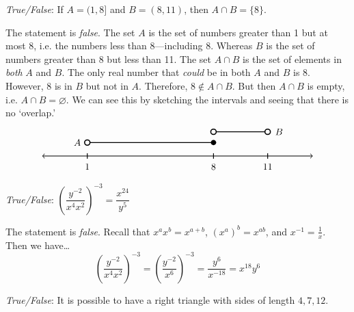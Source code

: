 \documentclass[11pt,letterpaper]{article}
\begin{document}
\thispagestyle{title}

 \textit{True/False}: If $A= (1, 8]$ and $B= (8, 11)$, then $A \cap B= \{ 8 \}$. \pspace

\sol The statement is \textit{false}. The set $A$ is the set of numbers greater than 1 but at most 8, i.e. the numbers less than 8---including 8. Whereas $B$ is the set of numbers greater than 8 but less than 11. The set $A \cap B$ is the set of elements in \textit{both} $A$ and $B$. The only real number that \textit{could} be in both $A$ and $B$ is $8$. However, 8 is in $B$ but not in $A$. Therefore, $8 \notin A \cap B$. But then $A \cap B$ is empty, i.e. $A \cap B= \varnothing$. We can see this by sketching the intervals and seeing that there is no `overlap.' 
	\[
	\begin{tikzpicture}
	\draw[line width=0.03cm,<->] (-5,0) -- (5,0);		%
	
	\draw[line width=0.03cm] (-3.33,-0.1) -- (-3.33,0.1);	%
	\draw[line width=0.03cm] (1.33,-0.1) -- (1.33,0.1); 	%
	\draw[line width=0.03cm] (3.33,-0.1) -- (3.33,0.1);	%
	\draw[line width=0.03cm] (-3.33, 0.5) -- (1.33,0.5);			%
	\draw[fill=white,line width=0.04cm] (-3.33,0.5) circle (0.1);		%
	\draw[draw=none,fill=black] (1.33,0.5) circle (0.1);			%
	\node at (-3.7,0.5) {$A$};								%
	\draw[line width=0.03cm] (1.33, 0.9) -- (3.33,0.9);			%
	\draw[fill=white,line width=0.04cm] (1.33,0.9) circle (0.1);		%
	\draw[fill=white,line width=0.04cm] (3.33,0.9) circle (0.1);		%
	\node at (3.75,0.9) {$B$};								%
	\node at (-3.33,-0.4) {$1$};	%
	\node at (1.33,-0.4) {$8$};		%
	\node at (3.33,-0.4) {$11$};	%
	\end{tikzpicture}
	\] \pvspace{1.3cm}



 \textit{True/False}: $\left( \dfrac{y^{-2}}{x^4 x^2} \right)^{-3}= \dfrac{x^{24}}{y^5}$ \pspace

\sol The statement is \textit{false}. Recall that $x^a x^b= x^{a + b}$, $(x^a)^b= x^{ab}$, and $x^{-1}= \frac{1}{x}$. Then we have\dots
	\[
	\left( \dfrac{y^{-2}}{x^4 x^2} \right)^{-3}= \left( \dfrac{y^{-2}}{x^6} \right)^{-3}= \dfrac{y^6}{x^{-18}}= x^{18} y^6
	\] \pvspace{1.3cm}



 \textit{True/False}: It is possible to have a right triangle with sides of length $4, 7, 12$. \pspace
\end{document}
